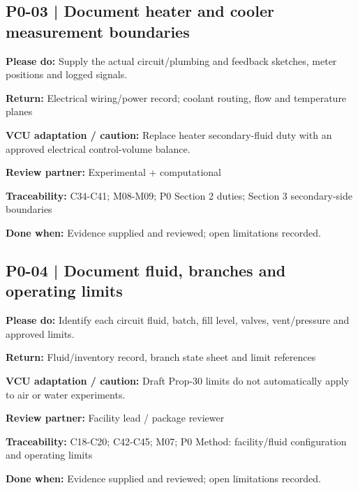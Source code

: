 \documentclass[11pt]{article}
\begin{document}
\begin{minipage}{\textwidth}\small\setlength{\parskip}{2pt}
\subsection*{P0-03 | Document heater and cooler measurement boundaries}
\textbf{Please do:} Supply the actual circuit/plumbing and feedback sketches, meter positions and logged signals.\par
\textbf{Return:} Electrical wiring/power record; coolant routing, flow and temperature planes\par
\textbf{VCU adaptation / caution:} Replace heater secondary-fluid duty with an approved electrical control-volume balance.\par
\textbf{Review partner:} Experimental + computational\par
\textbf{Traceability:} C34-C41; M08-M09; P0 Section 2 duties; Section 3 secondary-side boundaries\par
\textbf{Done when:} Evidence supplied and reviewed; open limitations recorded.\par
\end{minipage}\par\vspace{8pt}
\begin{minipage}{\textwidth}\small\setlength{\parskip}{2pt}
\subsection*{P0-04 | Document fluid, branches and operating limits}
\textbf{Please do:} Identify each circuit fluid, batch, fill level, valves, vent/pressure and approved limits.\par
\textbf{Return:} Fluid/inventory record, branch state sheet and limit references\par
\textbf{VCU adaptation / caution:} Draft Prop-30 limits do not automatically apply to air or water experiments.\par
\textbf{Review partner:} Facility lead / package reviewer\par
\textbf{Traceability:} C18-C20; C42-C45; M07; P0 Method: facility/fluid configuration and operating limits\par
\textbf{Done when:} Evidence supplied and reviewed; open limitations recorded.\par
\end{minipage}\par\vspace{8pt}
\end{document}
